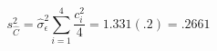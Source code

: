 

\[
s_{\hat{C}}^{2} = \hat{\sigma}_{\epsilon}^{2}\sum_{i=1}^{4}{\frac{c_{i}^{2}}{4}} = 1.331(.2) = .2661
\]


